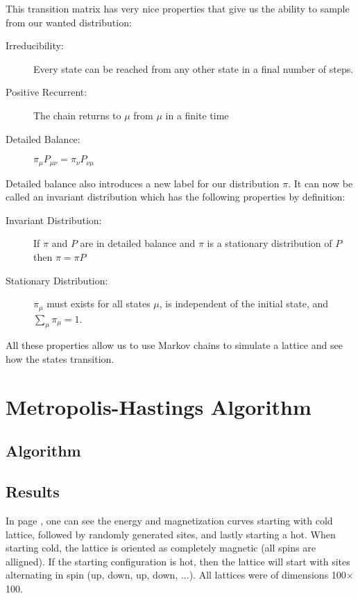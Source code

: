 \documentclass[a4]{scrartcl}
\begin{document}
This transition matrix has very nice properties that give us the ability to
sample from our wanted distribution:
\begin{description}
	\item[Irreducibility:] Every state can be reached from any other state in a final number of steps.
	\item[Positive Recurrent:] The chain returns to $\mu$ from $\mu$ in a finite time
	\item[Detailed Balance:] $ \pi_\mu P_{\mu \nu} = \pi_\nu P_{\nu \mu} $
\end{description}
Detailed balance also introduces a new label for our distribution $\pi$. It can
now be called an invariant distribution which has the following properties by
definition:
\begin{description}
	\item[Invariant Distribution:] If $\pi$ and $P$ are in detailed balance and $\pi$ is a stationary distribution of $P$ then $\pi = \pi P$
	\item[Stationary Distribution:] $\pi_\mu$ must exists for all states $\mu$, is independent of the initial state, and $ \sum_\mu \pi_\mu = 1 $. 
\end{description}

All these properties allow us to use Markov chains to simulate a lattice and
see how the states transition.
	

\section{Metropolis-Hastings Algorithm}
\subsection{Algorithm}

\subsection{Results}
In page \pageref{MCT}, one can see the energy and magnetization curves starting
with cold lattice, followed by randomly generated sites, and lastly starting a
hot. When starting cold, the lattice is oriented as completely magnetic (all
spins are alligned). If the starting configuration is hot, then the lattice
will start with sites alternating in spin (up, down, up, down, ...). All
lattices were of dimensions 100$\times$100.
\end{document}
